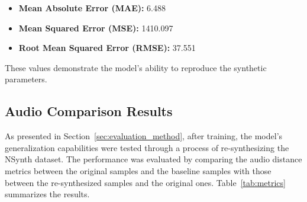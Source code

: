 \documentclass[10pt,conference]{IEEEtran}
\begin{document}
\begin{itemize}
    \item \textbf{Mean Absolute Error (MAE):} 6.488
    \item \textbf{Mean Squared Error (MSE):} 1410.097
    \item \textbf{Root Mean Squared Error (RMSE):} 37.551
\end{itemize}

These values demonstrate the model’s ability to reproduce the synthetic parameters.

\subsection{Audio Comparison Results}





As presented in Section~\ref{sec:evaluation_method}, after training, the model’s generalization capabilities were tested through a process of re-synthesizing the NSynth dataset. The performance was evaluated by comparing the audio distance metrics between the original samples and the baseline samples with those between the re-synthesized samples and the original ones. Table~\ref{tab:metrics} summarizes the results.
\end{document}
